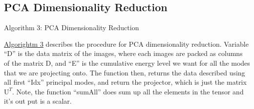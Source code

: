 \documentclass{article}
\begin{document}
    \subsection{PCA Dimensionality Reduction}
        \begin{algorithm}\label{alg:algo3}\scriptsize
            \begin{algorithmic}[H]
            \end{algorithmic}
            \caption{Algorithm 3: PCA Dimensionality Reduction}
        \end{algorithm}
        \hyperref[alg:algo3]{Algorightm 3} describes the procedure for PCA dimensionality reduction. Variable ``D'' is the data matrix of the images, where each images are packed as columns of the matrix D, and ``E'' is the cumulative energy level we want for all the modes that we are projecting onto. The function then, returns the data described using all first ``Idx'' principal modes, and return the projector, which is just the matrix $\text{U}^T$. Note, the function ``sumAll'' does sum up all the elements in the tensor and it's out put is a scalar. 
\end{document}
